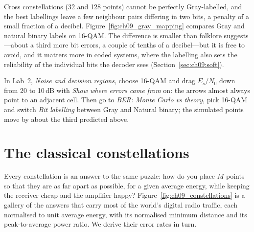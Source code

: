 Cross constellations (32 and 128 points) cannot be perfectly Gray-labelled, and the best
labellings leave a few neighbour pairs differing in two bits, a penalty of a small fraction of a
decibel. Figure~\ref{fig:ch09_gray_mapping} compares Gray and natural binary labels on 16-QAM. The
difference is smaller than folklore suggests---about a third more bit errors, a couple of tenths of
a decibel---but it is free to avoid, and it matters more in coded systems, where the labelling also
sets the reliability of the individual bits the decoder sees (Section~\ref{sec:ch09:soft}).


\begin{tryit}
In Lab~2, \emph{Noise and decision regions}, choose 16-QAM and drag $E_s/N_0$ down from 20 to
10\,dB with \emph{Show where errors came from} on: the arrows almost always point to an adjacent
cell. Then go to \emph{BER: Monte Carlo vs theory}, pick 16-QAM and switch \emph{Bit labelling}
between Gray and Natural binary; the simulated points move by about the third predicted above.
\end{tryit}

\section{The classical constellations}
\label{sec:ch09:constellations}

Every constellation is an answer to the same puzzle: how do you place $M$ points so that they are
as far apart as possible, for a given average energy, while keeping the receiver cheap and the
amplifier happy? Figure~\ref{fig:ch09_constellations} is a gallery of the answers that carry most
of the world's digital radio traffic, each normalised to unit average energy, with its normalised
minimum distance and its peak-to-average power ratio. We derive their error rates in turn.


